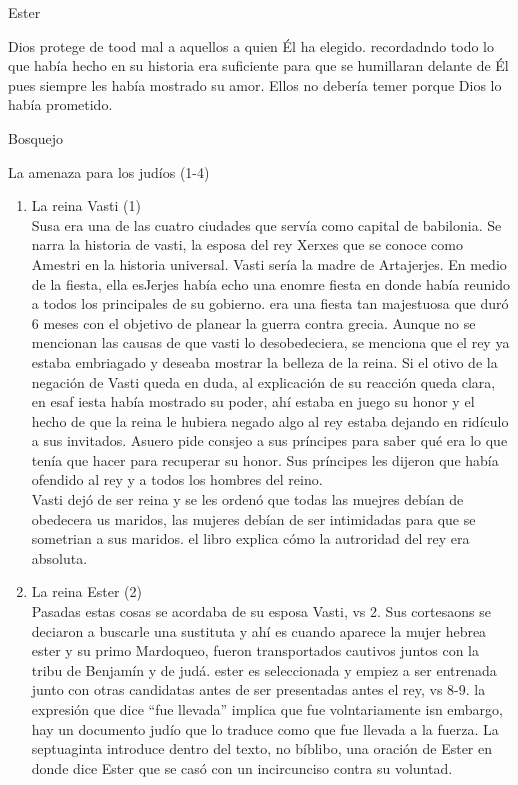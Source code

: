 \documentclass[12pt]{article}
\begin{document}
\begin{section}{Ester}
\begin{itemize}
			Dios protege de tood mal a aquellos a quien Él ha elegido. recordadndo todo lo que había hecho en su historia era suficiente para que se humillaran delante de Él pues siempre les había mostrado su amor. Ellos no debería temer porque Dios lo había prometido.
	\end{itemize}
	\begin{subsection}{Bosquejo}
		\begin{subsubsection}{La amenaza para los judíos (1-4)}
			\begin{enumerate}
				\item La reina Vasti (1)\\
					Susa era una de las cuatro ciudades que servía como capital de babilonia. Se narra la historia de vasti, la esposa del rey Xerxes que se conoce como Amestri en la historia universal. Vasti sería la madre de Artajerjes. En medio de la fiesta, ella esJerjes había echo una enomre fiesta en donde había reunido a todos los principales de su gobierno. era una fiesta tan majestuosa que duró 6 meses con el objetivo de planear la guerra contra grecia. Aunque no se mencionan las causas de que vasti lo desobedeciera, se menciona que el rey ya estaba embriagado y deseaba mostrar la belleza de la reina. Si el otivo de la negación de Vasti queda en duda, al explicación de su reacción queda clara, en esaf iesta había mostrado su poder, ahí estaba en juego su honor y el hecho de que la reina le hubiera negado algo al rey estaba dejando en ridículo a sus invitados. Asuero pide consjeo a sus príncipes para saber qué era lo que tenía que hacer para recuperar su honor. Sus príncipes les dijeron que había ofendido al rey y a todos los hombres del reino.\\
					Vasti dejó de ser reina y se les ordenó que todas las muejres debían de obedecera us maridos, las mujeres debían de ser intimidadas para que se sometrian a sus maridos. el libro explica cómo la autroridad del rey era absoluta.
				\item La reina Ester (2)\\
					Pasadas estas cosas se acordaba de su esposa Vasti, vs 2. Sus cortesaons se deciaron a buscarle una sustituta y ahí es cuando aparece la mujer hebrea ester y su primo Mardoqueo, fueron transportados cautivos juntos con la tribu de Benjamín y de judá. ester es seleccionada y empiez a ser entrenada junto con otras candidatas antes de ser presentadas antes el rey, vs 8-9. la expresión que dice ``fue llevada'' implica que fue volntariamente isn embargo, hay un documento judío que lo traduce como que fue llevada a la fuerza. La septuaginta introduce dentro del texto, no bíblibo, una oración de Ester en donde dice Ester que se casó con un incircunciso contra su voluntad.\\

\end{enumerate}
\end{subsubsection}
\end{subsection}
\end{section}
\end{document}
